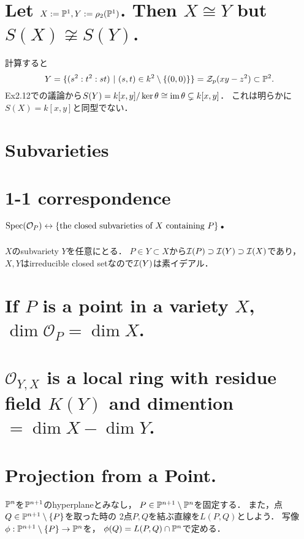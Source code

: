\documentclass[a4paper]{jsarticle}
\begin{document}
\section{Let $X:=\mathbb{P}^1, Y:=\rho_2(\mathbb{P}^1)$. Then $X \cong Y$ but $S(X) \not \cong S(Y)$. } 
    計算すると
    \[ Y=\{(s^2:t^2:st) ~|~ (s,t) \in k^2 \setminus \{(0,0)\} \}=\mathcal{Z}_p(xy-z^2) \subset \mathbb{P}^2.\]
    Ex2.12での議論から$S(Y)=k[x,y]/\ker \theta \cong \operatorname{im} \theta \subsetneq k[x,y]$．
    これは明らかに$S(X)=k[x,y]$と同型でない．

\section{Subvarieties} 

\section{1-1 correspondence \\ $\operatorname{Spec}(\mathcal{O}_P) \leftrightarrow \{\text{the closed subvarieties of $X$ containing $P$}\}$.} 
    $X$のsubvariety $Y$を任意にとる．    
    $P \in Y \subset X$から$\mathcal{I}(P) \supset \mathcal{I}(Y) \supset \mathcal{I}(X)$であり，
    $X, Y$はirreducible closed setなので$\mathcal{I}(Y)$は素イデアル．

\section{If $P$ is a point in a variety $X$, $\dim \mathcal{O}_P=\dim X$.} 

\section{$\mathcal{O}_{Y,X}$ is a local ring with residue field $K(Y)$ and dimention $=\dim X-\dim Y$.} 
    

\section{Projection from a Point.}
    $\mathbb{P}^n$を$\mathbb{P}^{n+1}$のhyperplaneとみなし，
    $P \in \mathbb{P}^{n+1} \setminus \mathbb{P}^n$を固定する．
    また，点$Q \in \mathbb{P}^{n+1} \setminus \{P\}$を取った時の
    2点$P,Q$を結ぶ直線を$L(P,Q)$としよう．
    写像$\phi: \mathbb{P}^{n+1} \setminus \{P\} \to \mathbb{P}^n$を，
    $\phi(Q)=L(P,Q) \cap \mathbb{P}^n$で定める．
\end{document}
